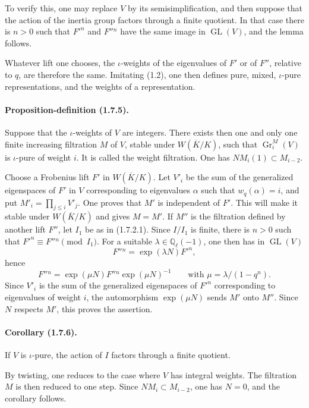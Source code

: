\documentclass[11pt]{article}
\theoremstyle{remark}
\newcommand{\Ql}{\mathbb{Q}_\ell}
\newcommand{\Gr}{\operatorname{Gr}}
\newcommand{\GL}{\operatorname{GL}}
\begin{document}
To verify this, one may replace $V$ by its semisimplification, and then suppose that the action of the inertia group factors through a finite quotient. In that case there is $n>0$ such that $F'^n$ and $F''{}^n$ have the same image in $\GL(V)$, and the lemma follows.

Whatever lift one chooses, the $\iota$-weights of the eigenvalues of $F'$ or of $F''$, relative to $q$, are therefore the same. Imitating (1.2), one then defines pure, mixed, $\iota$-pure representations, and the weights of a representation.

\paragraph{Proposition-definition (1.7.5).}
Suppose that the $\iota$-weights of $V$ are integers. There exists then one and only one finite increasing filtration $M$ of $V$, stable under $W(\overline K/K)$, such that $\Gr^M_i(V)$ is $\iota$-pure of weight $i$. It is called the weight filtration. One has $NM_i(1)\subset M_{i-2}$.

Choose a Frobenius lift $F'$ in $W(\overline K/K)$. Let $V'_i$ be the sum of the generalized eigenspaces of $F'$ in $V$ corresponding to eigenvalues $\alpha$ such that $w_q(\alpha)=i$, and put $M'_i=\prod_{j\le i}V'_j$. One proves that $M'$ is independent of $F'$. This will make it stable under $W(\overline K/K)$ and gives $M=M'$. If $M''$ is the filtration defined by another lift $F''$, let $I_1$ be as in (1.7.2.1). Since $I/I_1$ is finite, there is $n>0$ such that $F'^n\equiv F''{}^n\pmod{I_1}$. For a suitable $\lambda\in\Ql(-1)$, one then has in $\GL(V)$
\[
F''{}^n=\exp(\lambda N)F'^n,
\]
hence
\[
F''{}^n=\exp(\mu N)F''{}^n\exp(\mu N)^{-1}
\qquad\text{with }\mu=\lambda/(1-q^n).
\]
Since $V'_i$ is the sum of the generalized eigenspaces of $F'^n$ corresponding to eigenvalues of weight $i$, the automorphism $\exp(\mu N)$ sends $M'$ onto $M''$. Since $N$ respects $M'$, this proves the assertion.

\paragraph{Corollary (1.7.6).}
If $V$ is $\iota$-pure, the action of $I$ factors through a finite quotient.

By twisting, one reduces to the case where $V$ has integral weights. The filtration $M$ is then reduced to one step. Since $NM_i\subset M_{i-2}$, one has $N=0$, and the corollary follows.
\end{document}
